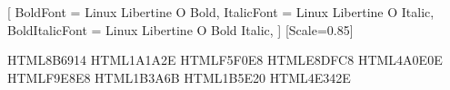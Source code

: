 
\usepackage[english]{babel}
\usepackage{fontspec}
  \setmainfont{Linux Libertine O}[
    BoldFont       = Linux Libertine O Bold,
    ItalicFont     = Linux Libertine O Italic,
    BoldItalicFont = Linux Libertine O Bold Italic,
  ]
  \setsansfont{Linux Biolinum O}
  \setmonofont{DejaVu Sans Mono}[Scale=0.85]

\usepackage[
  a4paper,
  top=2.2cm, bottom=2.5cm,
  left=2cm, right=2cm,
  columnsep=0.8cm
]{geometry}

\usepackage[dvipsnames, table]{xcolor}
  \definecolor{GoldRPG}       {HTML}{8B6914}
  \definecolor{DarkRPG}       {HTML}{1A1A2E}
  \definecolor{LightBG}       {HTML}{F5F0E8}
  \definecolor{MidBG}         {HTML}{E8DFC8}
  \definecolor{SecretRed}     {HTML}{4A0E0E}
  \definecolor{SecretBG}      {HTML}{F9E8E8}
  \definecolor{DoriaBlue}     {HTML}{1B3A6B}
  \definecolor{FieschiGreen}  {HTML}{1B5E20}
  \definecolor{SharedBrown}   {HTML}{4E342E}

\usepackage{microtype}
\usepackage{multicol}
\usepackage{parskip}
  \setlength{\parskip}{4pt}
  \setlength{\parindent}{0pt}

\usepackage{fancyhdr}
  \pagestyle{fancy}
  \fancyhf{}
  \renewcommand{\headrulewidth}{0.4pt}
  \fancyhead[RE,LO]{\small\textcolor{GoldRPG}{\leftmark}}
  \fancyfoot[C]{\small\textcolor{GoldRPG}{\thepage}}

